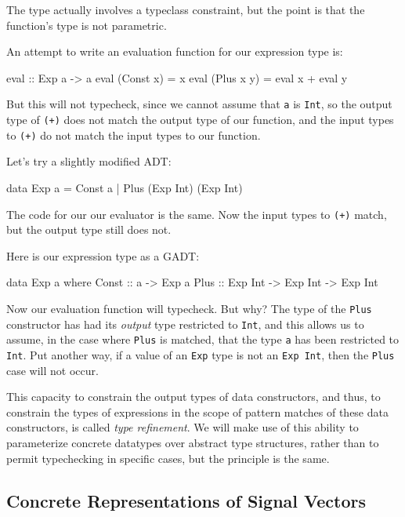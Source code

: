 The type actually involves a typeclass constraint, but the point is that the
function's type is not parametric.

An attempt to write an evaluation function for our expression type is:

\begin{code}
eval :: Exp a -> a
eval (Const x) = x
eval (Plus x y) = eval x + eval y
\end{code}

But this will not typecheck, since we cannot assume that {\tt a} is {\tt Int},
so the output type of {\tt (+)} does not match the output type of our function,
and the input types to {\tt (+)} do not match the input types to our function.

Let's try a slightly modified ADT:

\begin{code}
data Exp a = Const a | Plus (Exp Int) (Exp Int)
\end{code}

The code for our our evaluator is the same. Now the input types to {\tt (+)}
match, but the output type still does not.

Here is our expression type as a GADT:
\begin{code}
data Exp a where
  Const  ::  a -> Exp a
  Plus   :: Exp Int -> Exp Int -> Exp Int
\end{code}

Now our evaluation function will typecheck. But why? The type of the {\tt Plus}
constructor has had its {\em output} type restricted to {\tt Int}, and this
allows us to assume, in the case where {\tt Plus} is matched, that the type
{\tt a} has been restricted to {\tt Int}. Put another way, if a value of an
{\tt Exp} type is not an {\tt Exp Int}, then the {\tt Plus} case will not occur.

This capacity to constrain the output types of data constructors, and thus, to
constrain the types of expressions in the scope of pattern matches of these data
constructors, is called {\em type refinement}. We will make use of this ability
to parameterize concrete datatypes over abstract type structures, rather than to
permit typechecking in specific cases, but the principle is the same.

\subsection{Concrete Representations of Signal Vectors}
\label{subsection:Concrete_Representations_of_Signal_Vectors}

